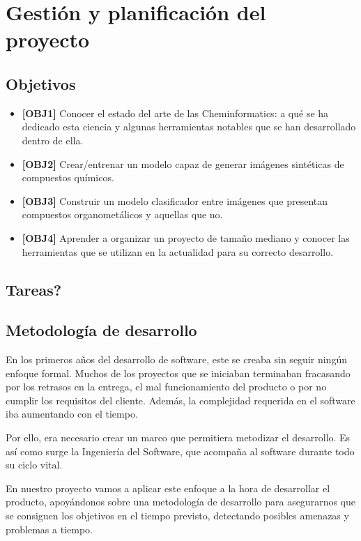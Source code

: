 \chapter*{Gestión y planificación del proyecto}

\section*{Objetivos}

\begin{itemize}
    \item \textbf{[OBJ1]} Conocer el estado del arte de las Cheminformatics: a qué se ha dedicado esta ciencia y algunas herramientas notables que se han desarrollado dentro de ella.
    \item \textbf{[OBJ2]} Crear/entrenar un modelo capaz de generar imágenes sintéticas de compuestos químicos.
    \item \textbf{[OBJ3]} Construir un modelo clasificador entre imágenes que presentan compuestos organometálicos y aquellas que no.
    \item \textbf{[OBJ4]} Aprender a organizar un proyecto de tamaño mediano y conocer las herramientas que se utilizan en la actualidad para su correcto desarrollo.
\end{itemize}

\section*{Tareas?}


\section*{Metodología de desarrollo}

En los primeros años del desarrollo de software, este se creaba sin seguir ningún enfoque formal. Muchos de los proyectos que se iniciaban terminaban fracasando por los retrasos en la entrega, el mal funcionamiento del producto o por no cumplir los requisitos del cliente. Además, la complejidad requerida en el software iba aumentando con el tiempo. 

Por ello, era necesario crear un marco que permitiera metodizar el desarrollo. Es así como surge la Ingeniería del Software, que acompaña al software durante todo su ciclo vital.

En nuestro proyecto vamos a aplicar este enfoque a la hora de desarrollar el producto, apoyándonos sobre una metodología de desarrollo para asegurarnos que se consiguen los objetivos en el tiempo previsto, detectando posibles amenazas y problemas a tiempo.


